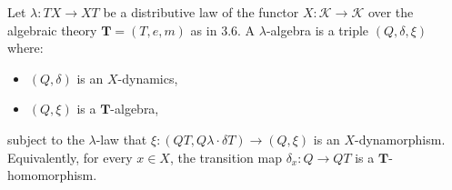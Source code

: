 Let $\lambda \colon TX \longrightarrow XT$ be a distributive law of the functor $X \colon \mathcal{K} \longrightarrow \mathcal{K}$ over the algebraic theory $\mathbf{T} = (T, e, m)$ as in 3.6. A $\lambda$-algebra is a triple $(Q, \delta, \xi)$ where:
\begin{itemize}
\item $(Q, \delta)$ is an $X$-dynamics,
\item $(Q, \xi)$ is a $\mathbf{T}$-algebra,
\end{itemize}
subject to the $\lambda$-law that $\xi \colon (QT, Q\lambda \cdot \delta T) \longrightarrow (Q, \xi)$ is an $X$-dynamorphism. Equivalently, for every $x \in X$, the transition map $\delta_x \colon Q \longrightarrow QT$ is a $\mathbf{T}$-homomorphism.
